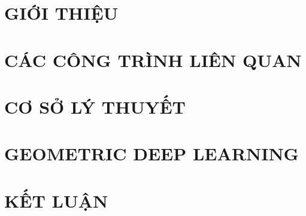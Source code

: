 \documentclass[a4paper, 12pt]{report}
\begin{document}
\renewcommand{\thepage}{\roman{page}}






%  
%
\newpage
%  
\setlength{\parskip}{0pt}


% 

% 

\tableofcontents
{}
\listoffigures  


\newpage 

\clearpage
\setcounter{page}{1}
\setcounter{chapter}{0}

\renewcommand{\thepage}{\arabic{page}}	

\setlength{\parskip}{1em}



\chapter{GIỚI THIỆU}\label{chap:lit}


\chapter{CÁC CÔNG TRÌNH LIÊN QUAN}


\chapter{CƠ SỞ LÝ THUYẾT}



\chapter{GEOMETRIC DEEP LEARNING}


\chapter{KẾT LUẬN}




%

%    

    
    \printbibliography[title=Tài liệu tham khảo]
    
\end{document}
